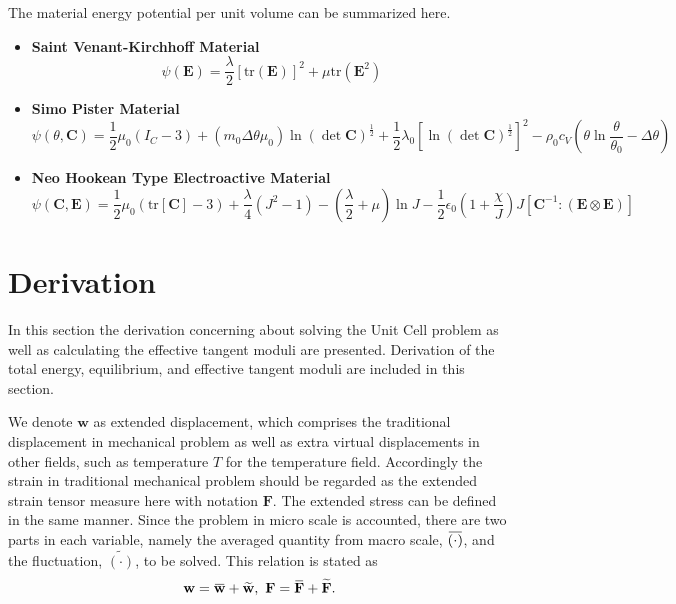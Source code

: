\documentclass[10pt,a4paper]{scrreprt}
\newcommand{\overbar}[1]{\mkern 1.5mu\overline{\mkern-1.5mu#1\mkern-1.5mu}\mkern 1.5mu}
\begin{document}
The material energy potential per unit volume can be summarized here.
\begin{itemize}
	\item[] \textbf{Saint Venant-Kirchhoff Material}
	\begin{equation}
	\label{eq: svk}
	\psi\left( \mathbf{E} \right) = \dfrac{\lambda}{2} \left[ \text{tr}(\mathbf{E}) \right]^{2} + \mu \text{tr} \left( \mathbf{E}^{2} \right)
	\end{equation}
	\item[] \textbf{Simo Pister Material}
	\begin{equation}
	\label{eq: sp mat}
	\psi\left( \theta, \mathbf{C} \right) = \frac{1}{2}\mu_{0} \left( I_{C}-3 \right) + \left( m_{0}\Delta \theta \mu_{0}\right) \ln (\det \mathbf{C})^{\frac{1}{2}} + \frac{1}{2} \lambda_{0} \left[ \ln \left( \det \mathbf{C} \right)^{\frac{1}{2}} \right]^{2} - \rho_{0} c_{V} \left( \theta \ln\dfrac{\theta}{\theta_{0}} - \Delta \theta \right)
	\end{equation}
	\item[] \textbf{Neo Hookean Type Electroactive Material}
	\begin{equation}
	\label{eq: nhk}
	\psi\left( \mathbf{C}, \mathbf{E} \right) =  \frac{1}{2}\mu_{0} \left( \text{tr}[\mathbf{C}]-3 \right) + \dfrac{\lambda}{4} \left( J^{2}-1 \right) - \left( \dfrac{\lambda}{2} + \mu \right) \ln J - \frac{1}{2} \epsilon_{0} \left( 1+\dfrac{\chi}{J} \right) J \left[ \mathbf{C}^{-1}: (\mathbf{E} \otimes \mathbf{E}) \right]
	\end{equation}
\end{itemize}

\section{Derivation}
In this section the derivation concerning about solving the Unit Cell problem as well as calculating the effective tangent moduli are presented. Derivation of the total energy, equilibrium, and effective tangent moduli are included in this section.

We denote $\mathbf{w}$ as extended displacement, which comprises the traditional displacement in mechanical problem as well as extra virtual displacements in other fields, such as temperature $T$ for the temperature field. Accordingly the strain in traditional mechanical problem should be regarded as the extended strain tensor measure here with notation $\mathbf{F}$. The extended stress can be defined in the same manner. Since the problem in micro scale is accounted, there are two parts in each variable, namely the averaged quantity from macro scale, $\overbar{(\cdot)}$, and the fluctuation, $\widetilde{(\cdot)}$, to be solved. This relation is stated as
\begin{equation}
\label{eq: decomp}
\mathbf{w} = \overbar{\mathbf{w}} + \widetilde{\mathbf{w}}, \ \mathbf{F} = \overbar{\mathbf{F}} + \widetilde{\mathbf{F}}.
\end{equation}
\end{document}

